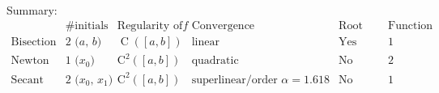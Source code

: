 Summary:
{
\tiny
\[\begin{array}{c|c|c|c|c|c}
    & \text{\#initials} & \text{Regularity of $f$} & \text{Convergence} & \text{Root between points} & \text{Function calls per iteration}
    \\\hline
    \text{Bisection} & \text{2 ($a$, $b$)} & \operatorname{C}([a, b]) & \text{linear} & \text{Yes} & 1
    \\\hline
    \text{Newton} & \text{1 ($x_0$)} & \operatorname{C^2}([a, b]) &
    \text{quadratic} & \text{No} & 2
    \\\hline
    \text{Secant} & \text{2 ($x_0$, $x_1$)} & \operatorname{C^2}([a, b]) &
    \text{superlinear/order $\alpha = 1.618$} & \text{No} & 1
\end{array}
\]
}